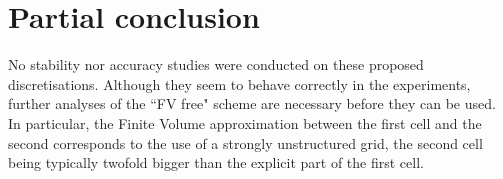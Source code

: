 \section{Partial conclusion}
No stability nor accuracy studies were conducted on these proposed
discretisations. Although they seem to behave correctly in the
experiments, further analyses of the ``FV free" scheme are
necessary before they can be used. In particular,
the Finite Volume approximation between the first cell and the second
corresponds to the use of a strongly unstructured grid,
the second cell being typically twofold bigger than
the explicit part of the first cell.

